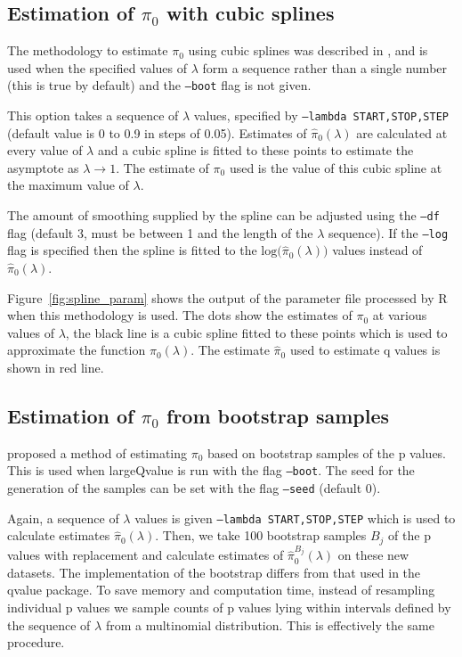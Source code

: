 \documentclass{amsart}
\begin{document}
\subsection{Estimation of $\pi_0$ with cubic splines}
\label{sec:spline}
The methodology to estimate $\pi_0$ using cubic splines was described in \citet{splinestorey}, and is used when the specified values of $\lambda$ form a sequence rather than a single number (this is true by default) and the \texttt{--boot} flag is not given.

This option takes a sequence of $\lambda$ values, specified by \texttt{--lambda START,STOP,STEP} (default value is 0 to 0.9 in steps of 0.05). Estimates of $\hat{\pi}_0(\lambda)$ are calculated at every value of $\lambda$ and a cubic spline is fitted to these points to estimate the asymptote as $\lambda\rightarrow1$. The estimate of $\pi_0$ used is the value of this cubic spline at the maximum value of $\lambda$.

The amount of smoothing supplied by the spline can be adjusted using the \texttt{--df} flag (default 3, must be between 1 and the length of the $\lambda$ sequence). If the \texttt{--log} flag is specified then the spline is fitted to the $\text{log(}\hat{\pi}_0(\lambda))$ values instead of $\hat{\pi}_0(\lambda)$.

Figure~\ref{fig:spline_param} shows the output of the parameter file processed by R when this methodology is used. The dots show the estimates of $\pi_0$ at various values of $\lambda$, the black line is a cubic spline fitted to these points which is used to approximate the function $\pi_0(\lambda)$. The estimate $\hat{\pi}_0$ used to estimate q values is shown in red line.

\subsection{Estimation of $\pi_0$ from bootstrap samples}
\label{sec:boot}
\citet{bootstorey} proposed a method of estimating $\pi_0$ based on bootstrap samples of the p values. This is used when largeQvalue is run with the flag \texttt{--boot}. The seed for the generation of the samples can be set with the flag \texttt{--seed} (default 0).

Again, a sequence of $\lambda$ values is given \texttt{--lambda START,STOP,STEP} which is used to calculate estimates $\hat{\pi}_0(\lambda)$. Then, we take 100 bootstrap samples $B_j$ of the p values with replacement and calculate estimates of  $\hat{\pi}^{B_j}_0(\lambda)$ on these new datasets. The implementation of the bootstrap differs from that used in the qvalue package. To save memory and computation time, instead of resampling individual p values we sample counts of p values lying within intervals defined by the sequence of $\lambda$ from a multinomial distribution. This is effectively the same procedure.
\end{document}

